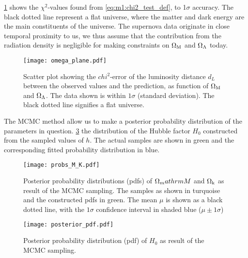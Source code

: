     \cref{fig:m1:omega_planes} shows the $\chi^2$-values found from \cref{eq:m1:chi2_test_def}, to 1$\sigma$ accuracy. The black dotted line represent a flat universe, where the matter and dark energy are the main constituents of the universe. The supernova data originate in close temporal proximity to us, we thus assume that the contribution from the radiation density is negligible for making constraints on $\Omega_\mathrm{M}$ and $\Omega_\Lambda$ today. 

    \begin{figure}
        \texttt{[image: omega\_plane.pdf]}
        \caption{Scatter plot showing the $chi^2$-error of the luminosity distance $d_L$ between the observed values and the prediction, as function of $\Omega_\mathrm{M}$ and $\Omega_\Lambda$. The data shown is within $1\sigma$ (standard deviation). The black dotted line signifies a flat universe. }
        \label{fig:m1:omega_planes}
    \end{figure}

    The MCMC method allow us to make a posterior probability distribution of the parameters in question. \cref{fig:m1:posterior_pdf_H0} the distribution of the Hubble factor $H_0$ constructed from the sampled values of $h$. The actual samples are shown in green and the corresponding fitted probability distribution in blue. 


    \begin{figure}
        \texttt{[image: probs\_M\_K.pdf]}
        \caption{Posterior probability distributions (pdfs) of $\Omega_mathrm{M}$ and $\Omega_\mathrm{k}$ as result of the MCMC sampling. The samples as shown in turquoise and the constructed pdfs in green. The mean $\mu$ is shown as a black dotted line, with the $1\sigma$ confidence interval in shaded blue ($\mu\pm 1\sigma$)}
        \label{fig:m1:posterior_pdf_omega_m_k}
    \end{figure}

    \begin{figure}
        \texttt{[image: posterior\_pdf.pdf]}
        \caption{Posterior probability distribution (pdf) of $H_0$ as result of the MCMC sampling.}
        \label{fig:m1:posterior_pdf_H0}
    \end{figure}

